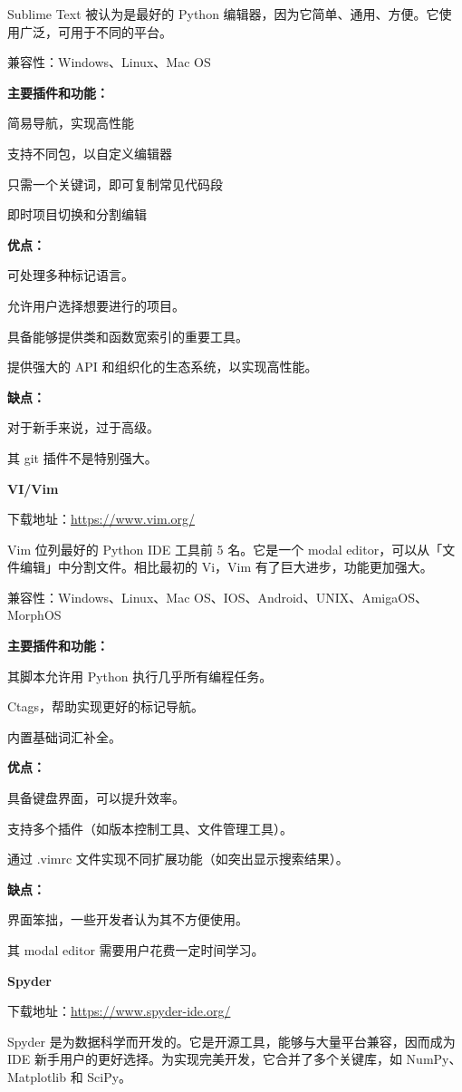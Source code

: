 \documentclass[]{ctexbook}
\begin{document}
Sublime Text 被认为是最好的 Python 编辑器，因为它简单、通用、方便。它使用广泛，可用于不同的平台。

兼容性：Windows、Linux、Mac OS

\textbf{主要插件和功能：}

简易导航，实现高性能

支持不同包，以自定义编辑器

只需一个关键词，即可复制常见代码段

即时项目切换和分割编辑

\textbf{优点：}

可处理多种标记语言。

允许用户选择想要进行的项目。

具备能够提供类和函数宽索引的重要工具。

提供强大的 API 和组织化的生态系统，以实现高性能。

\textbf{缺点：}

对于新手来说，过于高级。

其 git 插件不是特别强大。

\textbf{VI/Vim}

下载地址：\url{https://www.vim.org/}

Vim 位列最好的 Python IDE 工具前 5 名。它是一个 modal editor，可以从「文件编辑」中分割文件。相比最初的 Vi，Vim 有了巨大进步，功能更加强大。

兼容性：Windows、Linux、Mac OS、IOS、Android、UNIX、AmigaOS、MorphOS

\textbf{主要插件和功能：}

其脚本允许用 Python 执行几乎所有编程任务。

Ctags，帮助实现更好的标记导航。

内置基础词汇补全。

\textbf{优点：}

具备键盘界面，可以提升效率。

支持多个插件（如版本控制工具、文件管理工具）。

通过 .vimrc 文件实现不同扩展功能（如突出显示搜索结果）。

\textbf{缺点：}

界面笨拙，一些开发者认为其不方便使用。

其 modal editor 需要用户花费一定时间学习。

\textbf{Spyder}

下载地址：\url{https://www.spyder-ide.org/}

Spyder 是为数据科学而开发的。它是开源工具，能够与大量平台兼容，因而成为 IDE 新手用户的更好选择。为实现完美开发，它合并了多个关键库，如 NumPy、Matplotlib 和 SciPy。
\end{document}
